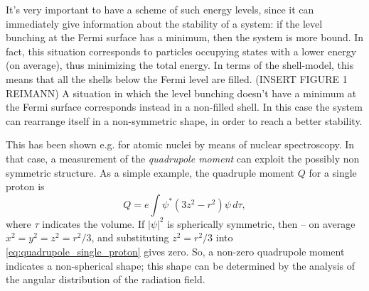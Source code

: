 \documentclass[a4paper,twoside,11pt]{book}
\begin{document}
It's very important to have a scheme of such energy levels, since it can immediately give information about the stability of a system: if the level bunching at the Fermi surface has a minimum, then the system is more bound. In fact, this situation corresponds to particles occupying states with a lower energy (on average), thus minimizing the total energy. In terms of the shell-model, this means that all the shells below the Fermi level are filled. (INSERT FIGURE 1 REIMANN) A situation in which the level bunching doesn't have a minimum at the Fermi surface corresponds instead in a non-filled shell. In this case the system can rearrange itself in a non-symmetric shape, in order to reach a better stability.

This has been shown e.g. for atomic nuclei by means of nuclear spectroscopy. In that case, a measurement of the \emph{quadrupole moment} can exploit the possibly non symmetric structure. As a simple example, the quadruple moment $Q$ for a single proton is
\begin{equation}
	Q = e \int \psi^*(3z^2-r^2)\psi\,d\tau,
	\label{eq:quadrupole_single_proton}
\end{equation}
where $\tau$ indicates the volume. If $|\psi|^2$ is spherically symmetric, then -- on average $x^2=y^2=z^2=r^2/3$, and substituting $z^2=r^2/3$ into \eqref{eq:quadrupole_single_proton} gives zero. So, a non-zero quadrupole moment indicates a non-spherical shape; this shape can be determined by the analysis of the angular distribution of the radiation field.
\end{document}
